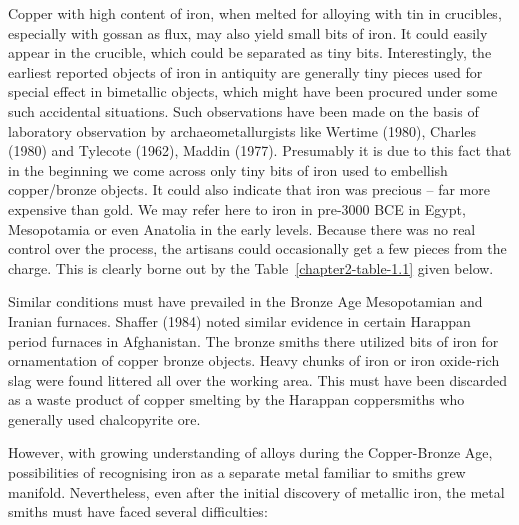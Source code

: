 Copper with high content of iron, when melted for alloying with tin in crucibles, especially with gossan as flux, may also yield small bits of iron. It could easily appear in the crucible, which could be separated as tiny bits.  Interestingly, the earliest reported objects of iron in antiquity are generally tiny pieces used for special effect in bimetallic objects, which might have been procured under some such accidental situations. Such observations have been made on the basis of laboratory observation by archaeometallurgists like Wertime (1980), Charles (1980) and Tylecote (1962), Maddin (1977). Presumably it is due to this fact that in the beginning we come across only tiny bits of iron used to embellish copper/bronze objects. It could also indicate that iron was precious – far more expensive than gold. We may refer here to iron in pre-3000 BCE in Egypt, Mesopotamia or even Anatolia in the early levels. Because there was no real control over the process, the artisans could occasionally get a few pieces from the charge.  This is clearly borne out by the Table~\ref{chapter2-table-1.1} given below. 

Similar conditions must have prevailed in the Bronze Age Mesopotamian and Iranian furnaces. Shaffer (1984) noted similar evidence in certain Harappan period furnaces in Afghanistan. The bronze smiths there utilized bits of iron for ornamentation of copper bronze objects. Heavy chunks of iron or iron oxide-rich slag were found littered all over the working area. This must have been discarded as a waste product of copper smelting by the Harappan coppersmiths who generally used chalcopyrite ore.

However, with growing understanding of alloys during the Copper-Bronze Age, possibilities of recognising iron as a separate metal familiar to smiths grew manifold. Nevertheless, even after the initial discovery of metallic iron, the metal smiths must have faced several difficulties:

\vspace{-.3cm}


